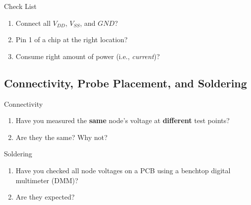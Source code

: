 










\begin{textbox}{Check List}
\begin{enumerate}
    \item Connect all $V_{DD}$, $V_{SS}$, and $GND$?
    \item Pin 1 of a chip at the right location?
    \item Consume right amount of power (i.e., \emph{current})?
\end{enumerate}
    
\end{textbox}

\subsection{Connectivity, Probe Placement, and Soldering}

\begin{textbox}{Connectivity}
\begin{enumerate}
    \item Have you measured the \textbf{same} node's voltage at \textbf{different} test points?
    \item Are they the same? Why not?
\end{enumerate}
    
\end{textbox}

\begin{textbox}{Soldering}
\begin{enumerate}
    \item Have you checked all node voltages on a PCB using a benchtop digital multimeter (DMM)?
    \item Are they expected?
\end{enumerate}
    
\end{textbox}

